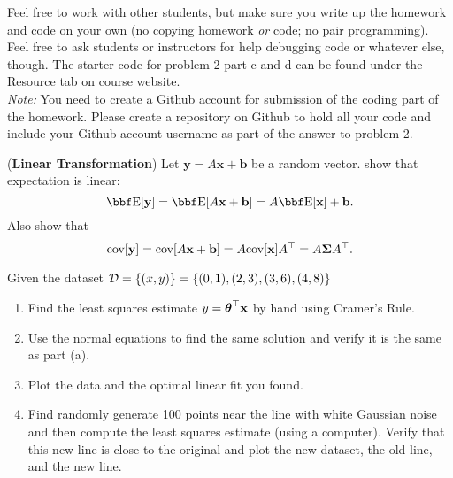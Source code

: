 \documentclass[12pt,letterpaper]{hmcpset}
\begin{document}
Feel free to work with other students, but make sure you write up the homework
and code on your own (no copying homework \textit{or} code; no pair programming).
Feel free to ask students or instructors for help debugging code or whatever else,
though.
The starter code for problem 2 part c and d can be found under the Resource tab on course website.\\

\textit{Note:} You need to create a Github account for submission of the coding part of the homework. Please create a repository on Github to hold all your code and include your Github account username as part of the answer to problem 2.

\begin{problem}[1]
(\textbf{Linear Transformation}) Let $\mathbf{y} = A\mathbf{x} + \mathbf{b}$ be a random vector.
show that expectation is linear:
\[
    \EE[\yy] = \EE[A\xx + \bb] = A\EE[\xx] + \bb.
\]
Also show that
\[
    {\hbox{cov}}[{\bf y}] = {\hbox{cov}}[A{\bf x} + {\bf b}] = A {\hbox{cov}}[{\bf x}] A^\top = A\hbox{\boldmath$\Sigma$} A^\top.
\]
\end{problem}
\begin{solution}
    \vfill
\end{solution}
\newpage




\begin{problem}[2]
Given the dataset ${\cal D} = \{(x,y)\} = \{(0,1), (2,3), (3,6), (4,8)\}$
\begin{enumerate}
   \item Find the least squares estimate $y = \hbox{\boldmath$\theta$}^\top{\bf x}$ by hand using
        Cramer's Rule.
    \item Use the normal equations to find the same solution and verify it
        is the same as part (a).
    \item Plot the data and the optimal linear fit you found.
    \item Find randomly generate 100 points near the line with white Gaussian
        noise and then compute the least squares estimate (using a computer).
        Verify that this new line is close to the original and plot the new
        dataset, the old line, and the new line.
\end{enumerate}

\end{problem}
\begin{solution}
    \vfill
\end{solution}
\newpage
\end{document}
